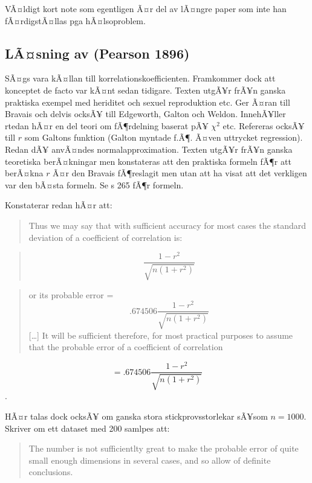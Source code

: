 \documentclass[]{article}
\begin{document}
VÃ¤ldigt kort note som egentligen Ã¤r del av lÃ¤ngre paper som inte han
fÃ¤rdigstÃ¤llas pga hÃ¤lsoproblem.

\subsection{LÃ¤sning av (Pearson 1896)}\label{lasning-av-pearson1896}

SÃ¤gs vara kÃ¤llan till korrelationskoefficienten. Framkommer dock att
konceptet de facto var kÃ¤nt sedan tidigare. Texten utgÃ¥r frÃ¥n ganska
praktiska exempel med heriditet och sexuel reproduktion etc. Ger Ã¤ran
till Bravais och delvis ocksÃ¥ till Edgeworth, Galton och Weldon.
InnehÃ¥ller rtedan hÃ¤r en del teori om fÃ¶rdelning baserat pÃ¥
\(\chi^2\) etc. Refereras ocksÃ¥ till \(r\) som Galtons funktion (Galton
myntade f.Ã¶. Ã¤ven uttrycket regression). Redan dÃ¥ anvÃ¤ndes
normalapproximation. Texten utgÃ¥r frÃ¥n ganska teoretiska berÃ¤kningar
men konstateras att den praktiska formeln fÃ¶r att berÃ¤kna \(r\) Ã¤r
den Bravais fÃ¶reslagit men utan att ha visat att det verkligen var den
bÃ¤sta formeln. Se s 265 fÃ¶r formeln.

Konstaterar redan hÃ¤r att:

\begin{quote}
Thus we may say that with sufficient accuracy for most cases the
standard deviation of a coefficient of correlation is:
\end{quote}

\begin{quote}
\[\frac{1 - r^2}{\sqrt{n(1 + r^2)}}\]
\end{quote}

\begin{quote}
or its probable error = \[.674506 \frac{1- r^2}{\sqrt{n(1 +r^2)}}\]
{[}\ldots{}{]} It will be sufficient therefore, for most practical
purposes to assume that the probable error of a coefficient of
correlation
\end{quote}

\[= .674506 \frac{1 - r^2}{\sqrt{n(1+r^2)}}\].

HÃ¤r talas dock ocksÃ¥ om ganska stora stickprovsstorlekar sÃ¥som
\(n = 1000\). Skriver om ett dataset med 200 samlpes att:

\begin{quote}
The number is not sufficientlty great to make the probable error of
quite small enough dimensions in several cases, and so allow of definite
conclusions.
\end{quote}
\end{document}
